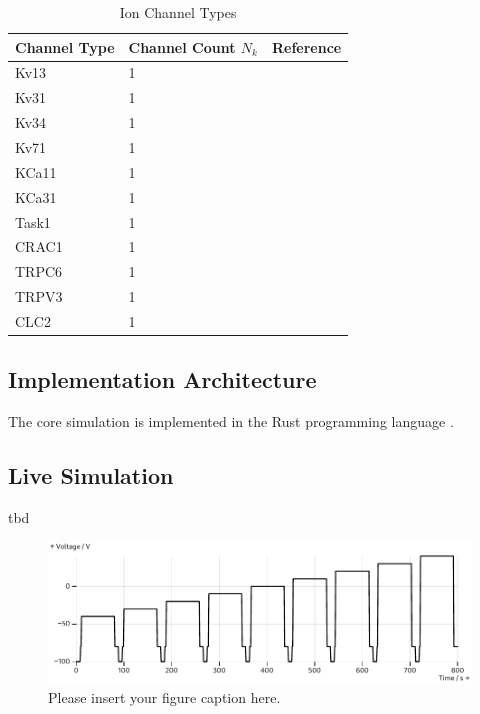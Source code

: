 \documentclass[USenglish,twocolumn]{article}
\begin{document}
  \begin{table}
    \caption{Ion Channel Types}
    \begin{tabular}{lll}
      \textbf{Channel Type} & \textbf{Channel Count $N_k$} & \textbf{Reference}            \\
      \midrule
      Kv13                  & 1                            & \cite{1998-potassium-channel} \\
      Kv31                  & 1                            & \cite{1998-potassium-channel} \\
      Kv34                  & 1                            & \cite{1998-potassium-channel} \\
      Kv71                  & 1                            & \cite{1998-potassium-channel} \\
      KCa11                 & 1                            & \cite{1998-potassium-channel} \\
      KCa31                 & 1                            & \cite{1998-potassium-channel} \\
      Task1                 & 1                            & \cite{1998-potassium-channel} \\
      CRAC1                 & 1                            & \cite{1998-potassium-channel} \\
      TRPC6                 & 1                            & \cite{1998-potassium-channel} \\
      TRPV3                 & 1                            & \cite{1998-potassium-channel} \\
      CLC2                  & 1                            & \cite{1998-potassium-channel} \\
    \end{tabular}
    \label{table:channel-types}
  \end{table}

  \subsection{Implementation Architecture}
  The core simulation is implemented in the Rust programming language \cite{2014-rust}.

  \subsection{Live Simulation}
  tbd

  \begin{figure}
    \includegraphics[width=\columnwidth]{../figures/results/voltage-protocol.pdf}
    \caption{Please insert your figure caption here.}
    \label{figure:voltage-protocol}
  \end{figure}
\end{document}
